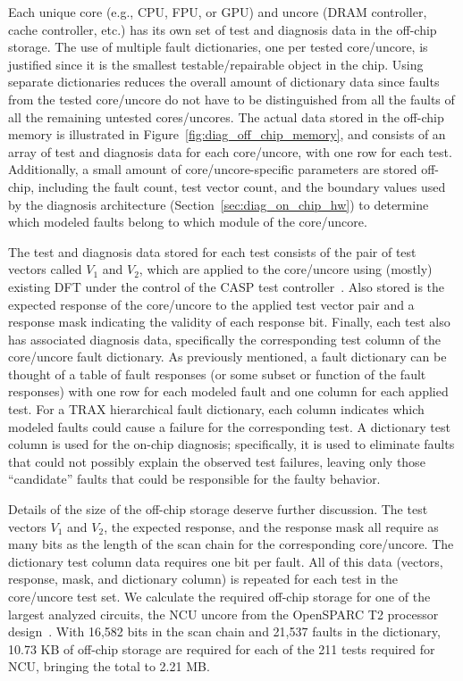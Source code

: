 Each unique core (e.g., CPU, FPU, or GPU) and uncore (DRAM controller, cache controller, etc.) has its own set of test and diagnosis data in the off-chip storage.
%
The use of multiple fault dictionaries, one per tested core/uncore, is justified since it is the smallest testable/repairable object in the chip.
%
Using separate dictionaries reduces the overall amount of dictionary data since faults from the tested core/uncore do not have to be distinguished from all the faults of all the remaining untested cores/uncores.
%
The actual data stored in the off-chip memory is illustrated in Figure~\ref{fig:diag_off_chip_memory}, and consists of an array of test and diagnosis data for each core/uncore, with one row for each test.
%
Additionally, a small amount of core/uncore-specific parameters are stored off-chip, including the fault count, test vector count, and the boundary values used by the diagnosis architecture (Section~\ref{sec:diag_on_chip_hw}) to determine which modeled faults belong to which module of the core/uncore.

The test and diagnosis data stored for each test consists of the pair of test vectors called $V_1$ and $V_2$, which are applied to the core/uncore using (mostly) existing DFT under the control of the CASP test controller~\cite{li08,li10,li13}.
%
Also stored is the expected response of the core/uncore to the applied test vector pair and a response mask indicating the validity of each response bit.
%
Finally, each test also has associated diagnosis data, specifically the corresponding test column of the core/uncore fault dictionary.
%
As previously mentioned, a fault dictionary can be thought of a table of fault responses (or some subset or function of the fault responses) with one row for each modeled fault and one column for each applied test.
%
For a TRAX hierarchical fault dictionary, each column indicates which modeled faults could cause a failure for the corresponding test.
%
A dictionary test column is used for the on-chip diagnosis; specifically, it is used to eliminate faults that could not possibly explain the observed test failures, leaving only those ``candidate'' faults that could be responsible for the faulty behavior.

Details of the size of the off-chip storage deserve further discussion.
%
The test vectors $V_1$ and $V_2$, the expected response, and the response mask all require as many bits as the length of the scan chain for the corresponding core/uncore.
%
The dictionary test column data requires one bit per fault.
%
All of this data (vectors, response, mask, and dictionary column) is repeated for each test in the core/uncore test set.
%
We calculate the required off-chip storage for one of the largest analyzed circuits, the NCU uncore from the OpenSPARC T2 processor design~\cite{sun11}.
%
With 16,582 bits in the scan chain and 21,537 faults in the dictionary, 10.73 KB of off-chip storage are required for each of the 211 tests required for NCU, bringing the total to 2.21 MB.

